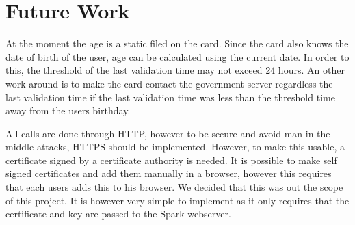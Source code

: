 \documentclass[12pt]{report}
\begin{document}
\section{Future Work}
At the moment the age is a static filed on the card. Since the card also knows the date of birth of the user, age can be calculated using the current date. In order to this, the threshold of the last validation time may not exceed 24 hours. An other work around is to make the card contact the government server regardless the last validation time if the last validation time was less than the threshold time away from the users birthday.

All calls are done through HTTP, however to be secure and avoid man-in-the-middle attacks, HTTPS should be implemented. However, to make this usable, a certificate signed by a certificate authority is needed. It is possible to make self signed certificates and add them manually in a browser, however this requires that each users adds this to his browser. We decided that this was out the scope of this project. It is however very simple to implement as it only requires that the certificate and key are passed to the Spark webserver.
\end{document}
